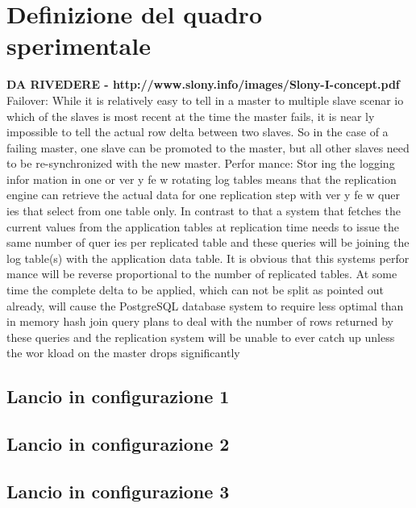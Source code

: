 \chapter{Definizione del quadro sperimentale}
\textbf{DA RIVEDERE - http://www.slony.info/images/Slony-I-concept.pdf}\\
Failover: While it is relatively easy to tell in a master to multiple slave scenar io
which of the slaves is most recent at the time the master fails, it is
near ly impossible to tell the actual row delta between two slaves. So in
the case of a failing master, one slave can be promoted to the master,
but all other slaves need to be re-synchronized with the new master.
Perfor mance:
Stor ing the logging infor mation in one or ver y fe w rotating log tables
means that the replication engine can retrieve the actual data for one
replication step with ver y fe w quer ies that select from one table only. In
contrast to that a system that fetches the current values from the application
tables at replication time needs to issue the same number of
quer ies per replicated table and these queries will be joining the log
table(s) with the application data table. It is obvious that this systems
perfor mance will be reverse proportional to the number of replicated
tables. At some time the complete delta to be applied, which can not
be split as pointed out already, will cause the PostgreSQL database
system to require less optimal than in memory hash join query plans to
deal with the number of rows returned by these queries and the replication
system will be unable to ever catch up unless the wor kload on
the master drops significantly
\section{Lancio in configurazione 1}
\section{Lancio in configurazione 2}
\section{Lancio in configurazione 3}